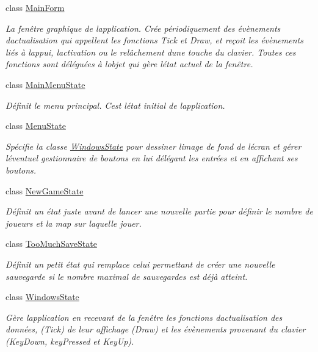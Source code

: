 \begin{DoxyCompactItemize}
class \hyperlink{class_tentacle_slicers_1_1windows_1_1_main_form}{Main\+Form}
\begin{DoxyCompactList}\small\item\em La fenêtre graphique de l\textquotesingle{}application. Crée périodiquement des évènements d\textquotesingle{}actualisation qui appellent les fonctions Tick et Draw, et reçoit les évènements liés à l\textquotesingle{}appui, l\textquotesingle{}activation ou le relâchement d\textquotesingle{}une touche du clavier. Toutes ces fonctions sont déléguées à l\textquotesingle{}objet qui gère l\textquotesingle{}état actuel de la fenêtre. \end{DoxyCompactList}\item 
class \hyperlink{class_tentacle_slicers_1_1windows_1_1_main_menu_state}{Main\+Menu\+State}
\begin{DoxyCompactList}\small\item\em Définit le menu principal. C\textquotesingle{}est l\textquotesingle{}état initial de l\textquotesingle{}application. \end{DoxyCompactList}\item 
class \hyperlink{class_tentacle_slicers_1_1windows_1_1_menu_state}{Menu\+State}
\begin{DoxyCompactList}\small\item\em Spécifie la classe \hyperlink{class_tentacle_slicers_1_1windows_1_1_windows_state}{Windows\+State} pour dessiner l\textquotesingle{}image de fond de l\textquotesingle{}écran et gérer l\textquotesingle{}éventuel gestionnaire de boutons en lui délégant les entrées et en affichant ses boutons. \end{DoxyCompactList}\item 
class \hyperlink{class_tentacle_slicers_1_1windows_1_1_new_game_state}{New\+Game\+State}
\begin{DoxyCompactList}\small\item\em Définit un état juste avant de lancer une nouvelle partie pour définir le nombre de joueurs et la map sur laquelle jouer. \end{DoxyCompactList}\item 
class \hyperlink{class_tentacle_slicers_1_1windows_1_1_too_much_save_state}{Too\+Much\+Save\+State}
\begin{DoxyCompactList}\small\item\em Définit un petit état qui remplace celui permettant de créer une nouvelle sauvegarde si le nombre maximal de sauvegardes est déjà atteint. \end{DoxyCompactList}\item 
class \hyperlink{class_tentacle_slicers_1_1windows_1_1_windows_state}{Windows\+State}
\begin{DoxyCompactList}\small\item\em Gère l\textquotesingle{}application en recevant de la fenêtre les fonctions d\textquotesingle{}actualisation des données, (Tick) de leur affichage (Draw) et les évènements provenant du clavier (Key\+Down, key\+Pressed et Key\+Up). \end{DoxyCompactList}\end{DoxyCompactItemize}
